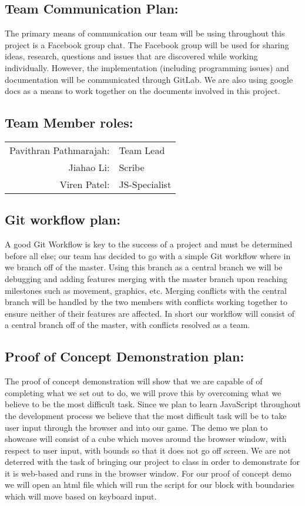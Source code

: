 \documentclass{article}
\begin{document}
\subsection*{Team Communication Plan:}  
The primary means of communication our
team will be using throughout this project is a Facebook group chat. The
Facebook group will be used for sharing ideas, research, questions and issues
that are discovered while working individually. However, the implementation
(including programming issues) and documentation will be communicated through
GitLab. We are also using google docs as a means to work together on the
documents involved in this project.

\subsection*{Team Member roles:}
\begin{table}[h!]     
	\begin{tabular}{r l}    
		Pavithran Pathmarajah: & Team Lead\\   
		Jiahao Li: & Scribe\\   
		Viren Patel: & JS-Specialist
	\end{tabular}
\end{table}

	
	
\subsection*{Git workflow plan:}  
A good Git Workflow is key to the success of a
project and must be determined before all else; our team has decided to go with
a simple Git workflow where in we branch off of the master. Using this branch as
a central branch we will be debugging and adding features merging with the
master branch upon reaching milestones such as movement, graphics, etc. Merging
conflicts with the central branch will be handled by the two members with
conflicts working together to ensure neither of their features are affected. In
short our workflow will consist of a central branch off of the master, with
conflicts resolved as a team.

\subsection*{Proof of Concept Demonstration plan:}  
The proof of concept
demonstration will show that we are capable of of completing what we set out to
do, we will prove this  by overcoming what we believe to be the most difficult
task. Since we plan to learn JavaScript throughout the development process we 
believe that the most difficult task will be to take user input through the
browser and into our game. The demo we plan to showcase will consist of a cube
which moves around the browser window, with respect to user input, with bounds
so that it does not go off screen. We are not deterred  with the task of
bringing our project to class in order to demonstrate for it is web-based and
runs in the browser window. For our proof of concept demo we will open an html
file which will run the script for our block with boundaries which will move
based on keyboard input.
\end{document}
